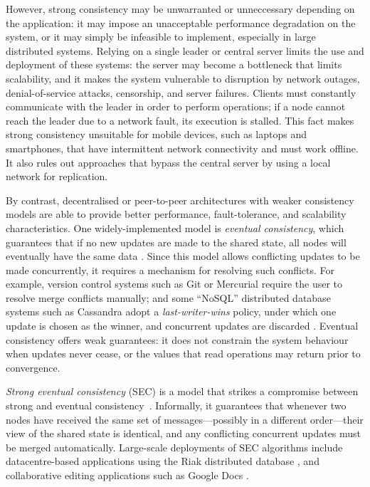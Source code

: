 \documentclass[acmlarge,review,anonymous]{acmart}
\begin{document}
However, strong consistency may be unwarranted or unneccessary depending on the application: it may impose an unacceptable performance degradation on the system, or it may simply be infeasible to implement, especially in large distributed systems.
Relying on a single leader or central server limits the use and deployment of these systems: the server may become a bottleneck that limits scalability, and it makes the system vulnerable to disruption by network outages, denial-of-service attacks, censorship, and server failures.
Clients must constantly communicate with the leader in order to perform operations; if a node cannot reach the leader due to a network fault, its execution is stalled.
This fact makes strong consistency unsuitable for mobile devices, such as laptops and smartphones, that have intermittent network connectivity and must work offline.
It also rules out approaches that bypass the central server by using a local network for replication.

By contrast, decentralised or peer-to-peer architectures with weaker consistency models are able to provide better performance, fault-tolerance, and scalability characteristics.
One widely-implemented model is \emph{eventual consistency}, which guarantees that if no new updates are made to the shared state, all nodes will eventually have the same data \cite{Bailis:2013jc,Burckhardt:2014hy,Terry:1994fp,Vogels:2009ca}.
Since this model allows conflicting updates to be made concurrently, it requires a mechanism for resolving such conflicts.
For example, version control systems such as Git or Mercurial require the user to resolve merge conflicts manually; and some ``NoSQL'' distributed database systems such as Cassandra adopt a \emph{last-writer-wins} policy, under which one update is chosen as the winner, and concurrent updates are discarded \cite{KingsburyCassandra}.
Eventual consistency offers weak guarantees: it does not constrain the system behaviour when updates never cease, or the values that read operations may return prior to convergence.

\emph{Strong eventual consistency} (SEC) is a model that strikes a compromise between strong and eventual consistency~\cite{Shapiro:2011un}.
Informally, it guarantees that whenever two nodes have received the same set of messages---possibly in a different order---their view of the shared state is identical, and any conflicting concurrent updates must be merged automatically.
Large-scale deployments of SEC algorithms include datacentre-based applications using the Riak distributed database \cite{Brown:2014hs}, and collaborative editing applications such as Google Docs \cite{DayRichter:2010tt}.
\end{document}
